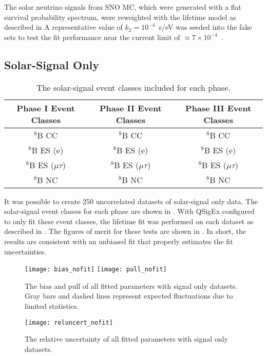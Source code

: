 The solar neutrino signals from SNO MC, which were generated with a flat survival probability spectrum, were reweighted with the lifetime model as described in  
A representative value of $k_2 = 10^{-4}$~s/eV was seeded into the fake sets to test the fit performance near the current limit of $\approx7\times10^{-4}$~\cite{picoreti}.

\subsection{Solar-Signal Only}
\label{3phase_sigonly}

\begin{table}
\centering
\begin{tabular}{ccc}
\hline
Phase I Event Classes & Phase II Event Classes & Phase III Event Classes  \\ \hline \hline
$^8$B CC & $^8$B CC & $^8$B CC \\
$^8$B ES (e) & $^8$B ES (e) & $^8$B ES (e) \\
$^8$B ES ($\mu\tau$) & $^8$B ES ($\mu\tau$) & $^8$B ES ($\mu\tau$) \\
$^8$B NC & $^8$B NC & $^8$B NC \\ \hline
\end{tabular}
\caption{
The solar-signal event classes included for each phase.
}
\label{tbl:sigonly_evcls}
\end{table}

It was possible to create 250 uncorrelated datasets of solar-signal only data.
The solar-signal event classes for each phase are shown in .
With QSigEx configured to only fit these event classes, the lifetime fit was performed on each dataset as described in . 
The figures of merit for these tests are shown in . 
In short, the results are consistent with an unbiased fit that properly estimates the fit uncertainties.

\begin{figure}
\centering
\texttt{[image: bias\_nofit]}
\texttt{[image: pull\_nofit]}
\caption{
The bias and pull of all fitted parameters with signal only datasets. Gray bars and dashed lines represent expected fluctuations due to limited statistics.
}
\label{fig:sigonly_biaspull}
\end{figure}

\begin{figure}
\centering
\texttt{[image: reluncert\_nofit]}
\caption{
The relative uncertainty of all fitted parameters with signal only datasets.
}
\label{fig:sigonly_reluncert}
\end{figure}

